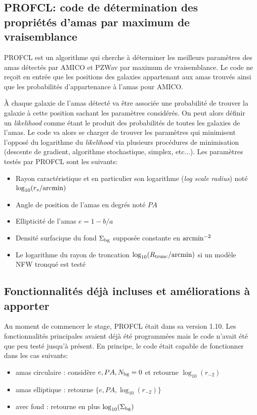 \documentclass[a4paper,11pt]{article}
\numberwithin{equation}{section}
\begin{document}
    \subsection{PROFCL: code de détermination des propriétés d'amas par maximum de vraisemblance}

    
      PROFCL est un algorithme qui cherche à déterminer les meilleurs paramètres des amas détectés par AMICO et PZWav par maximum de vraisemblance. Le code ne reçoit en entrée que les positions des galaxies appartenant aux amas trouvés ainsi que les probabilités d'appartenance à l'amas pour AMICO. \par
      À chaque galaxie de l'amas détecté va être associée une probabilité de trouver la galaxie à cette position sachant les paramètres considérés. On peut alors définir un \textit{likelihood} comme étant le produit des probabilités de toutes les galaxies de l'amas. Le code va alors se charger de trouver les paramètres qui minimisent l'opposé du logarithme du \textit{likelihood} via plusieurs procédures de minimisation (descente de gradient, algorithme stochastique, simplex, etc...).\newline
      Les paramètres testés par PROFCL sont les suivants:
      
      \begin{itemize}
        \item Rayon caractéristique et en particulier son logarithme (\textit{log scale radius}) noté $\log_{10} (r_s/\rm{arcmin})$
        \item Angle de position de l'amas en degrés noté $PA$
        \item Ellipticité de l'amas $e = 1 - b/a$
        \item Densité surfacique du fond $\Sigma_{\rm{bg}}$ supposée constante en $\rm{arcmin^{-2}}$
        \item Le logarithme du rayon de troncation $\log_{10} ( R_{\rm{trunc}} / \rm{arcmin})$ si un modèle NFW tronqué est testé
      \end{itemize}
	
	\subsection{Fonctionnalités déjà incluses et améliorations à apporter}
		Au moment de commencer le stage, PROFCL était dans sa version 1.10. Les fonctionnalités principales avaient déjà été programmées mais le code n'avait été que peu testé jusqu'à présent. En principe, le code était capable de fonctionner dans les cas suivants:
		\begin{itemize}
			\item amas circulaire : considère $e, PA, N_{\rm{bg}} = 0$  et retourne $\log_{10}(r_{-2})$
			\item amas elliptique : retourne $\lbrace e, PA, \log_{10}(r_{-2}) \rbrace$
			\item avec fond : retourne en plus $\log_{10} (\Sigma_{\rm{bg}})$
		\end{itemize}
		
\end{document}
